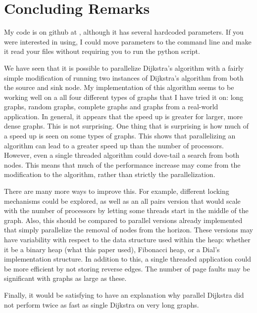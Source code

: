 \documentclass{article}
\begin{document}
\section{Concluding Remarks}


My code is on github at \cite{code}, although it has several hardcoded parameters.
If you were interested in using, I could move parameters to the command line and make it read your files without requiring you to run the python script.

We have seen that it is possible to parallelize Dijkstra's algorithm with a fairly simple modification of running two instances of Dijkstra's algorithm from both the source and sink node.
My implementation of this algorithm seems to be working well on a all four different types of graphs that I have tried it on: long graphs, random graphs, complete graphs and graphs from a real-world application.
In general, it appears that the speed up is greater for larger, more dense graphs.
This is not surprising.
One thing that is surprising is how much of a speed up is seen on some types of graphs.
This shows that parallelizing an algorithm can lead to a greater speed up than the number of processors.
However, even a single threaded algorithm could dove-tail a search from both nodes.
This means that much of the performance increase may come from the modification to the algorithm, rather than strictly the parallelization.

There are many more ways to improve this.
For example, different locking mechanisms could be explored, as well as an all pairs version that would scale with the number of processors by letting some threads start in the middle of the graph.
Also, this should be compared to parallel versions already implemented that simply parallelize the removal of nodes from the horizon.
These versions may have variability with respect to the data structure used within the heap: whether it be a binary heap (what this paper used), Fibonacci heap, or a Dial's implementation structure.
In addition to this, a single threaded application could be more efficient by not storing reverse edges.
The number of page faults may be significant with graphs as large as these.

Finally, it would be satisfying to have an explanation why parallel Dijkstra did not perform twice as fast as single Dijkstra on very long graphs.



\pagebreak
\end{document}
